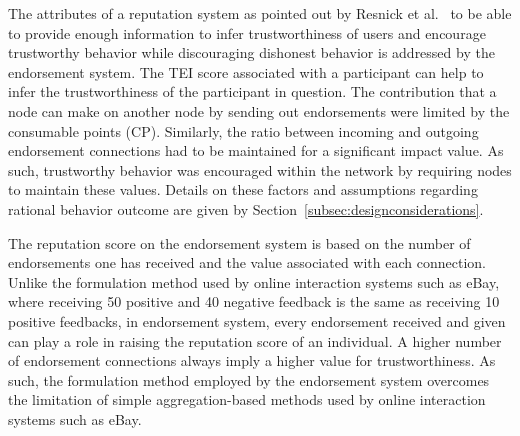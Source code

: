 The attributes of a reputation system as pointed out by Resnick et
al.~\cite{resnick2000reputation} to be able to provide enough information to
infer trustworthiness of users and encourage trustworthy behavior while
discouraging dishonest behavior is addressed by the endorsement system. The
\ac{TEI} score associated with a participant can help to infer the
trustworthiness of the participant in question. The contribution that a node
can make on another node by sending out endorsements were limited by the
consumable points (\ac{CP}). Similarly, the ratio between incoming and outgoing
endorsement connections had to be maintained for a significant impact value. As
such, trustworthy behavior was encouraged within the network by requiring nodes
to maintain these values. Details on these factors and assumptions regarding
rational behavior outcome are given by
Section~\ref{subsec:designconsiderations}. \par 

The reputation score on the endorsement system is based on the number of
endorsements one has received and the value associated with each connection.
Unlike the formulation method used by online interaction systems such as eBay,
where receiving 50 positive and 40 negative feedback is the same as receiving
10 positive feedbacks, in endorsement system, every endorsement received and
given can play a role in raising the reputation score of an individual. A
higher number of endorsement connections always imply a higher value for
trustworthiness. As such, the formulation method employed by the endorsement
system overcomes the limitation of simple aggregation-based methods used by
online interaction systems such as eBay. \par


